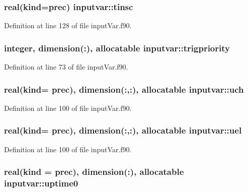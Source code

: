 \hypertarget{classinputvar_a3c4fd3f3b8a4ef86969e1e9eec3338c8}{
\subsubsection[{tinsc}]{\setlength{\rightskip}{0pt plus 5cm}real(kind=prec) inputvar\-::tinsc}}\label{classinputvar_a3c4fd3f3b8a4ef86969e1e9eec3338c8}


Definition at line 128 of file input\-Var.\-f90.

\hypertarget{classinputvar_aa06cb5d284b385bcfed4e6f34efa534f}{
\subsubsection[{trigpriority}]{\setlength{\rightskip}{0pt plus 5cm}integer, dimension(\-:), allocatable inputvar\-::trigpriority}}\label{classinputvar_aa06cb5d284b385bcfed4e6f34efa534f}


Definition at line 73 of file input\-Var.\-f90.

\hypertarget{classinputvar_a53339aa6533c8e2333ec3eaa4a54796b}{
\subsubsection[{uch}]{\setlength{\rightskip}{0pt plus 5cm}real(kind= prec), dimension(\-:,\-:), allocatable inputvar\-::uch}}\label{classinputvar_a53339aa6533c8e2333ec3eaa4a54796b}


Definition at line 100 of file input\-Var.\-f90.

\hypertarget{classinputvar_a8540cf286b75c5a77a2c3f8e2623617a}{
\subsubsection[{uel}]{\setlength{\rightskip}{0pt plus 5cm}real(kind= prec), dimension(\-:,\-:), allocatable inputvar\-::uel}}\label{classinputvar_a8540cf286b75c5a77a2c3f8e2623617a}


Definition at line 100 of file input\-Var.\-f90.

\hypertarget{classinputvar_a3938be0ea72158eee837e2a8c08f29e0}{
\subsubsection[{uptime0}]{\setlength{\rightskip}{0pt plus 5cm}real(kind = prec), dimension(\-:), allocatable inputvar\-::uptime0}}\label{classinputvar_a3938be0ea72158eee837e2a8c08f29e0}



